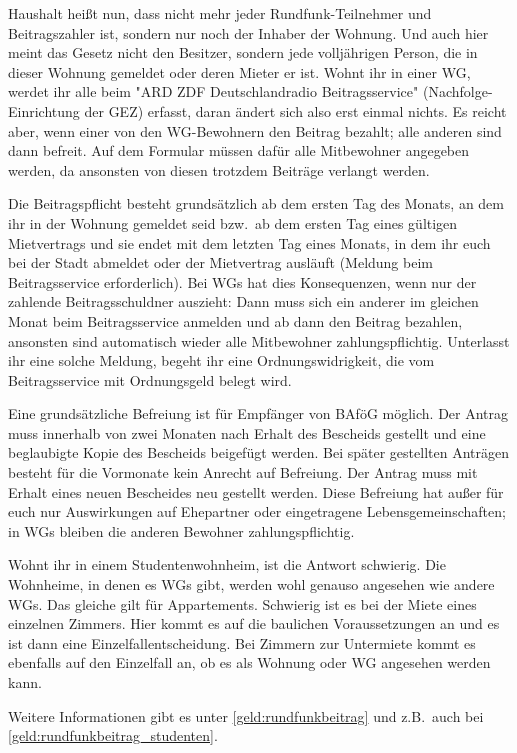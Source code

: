 \begin{multicols*}{2}
Haushalt heißt nun, dass nicht mehr jeder Rundfunk-Teilnehmer und Beitragszahler ist, sondern nur noch der Inhaber der Wohnung. Und auch hier meint das Gesetz nicht den Besitzer, sondern jede volljährigen Person, die in dieser Wohnung gemeldet oder deren Mieter er ist. Wohnt ihr in einer WG, werdet ihr alle beim "ARD ZDF Deutschlandradio Beitragsservice" (Nachfolge-Einrichtung der GEZ) erfasst, daran ändert sich also erst einmal nichts. Es reicht aber, wenn einer von den WG-Bewohnern den Beitrag bezahlt; alle anderen sind dann befreit. Auf dem Formular müssen dafür alle Mitbewohner angegeben werden, da ansonsten von diesen trotzdem Beiträge verlangt werden.

Die Beitragspflicht besteht grundsätzlich ab dem ersten Tag des Monats, an dem ihr in der Wohnung gemeldet seid bzw.\ ab dem ersten Tag eines gültigen Mietvertrags und sie endet mit dem letzten Tag eines Monats, in dem ihr euch bei der Stadt abmeldet oder der Mietvertrag ausläuft (Meldung beim Beitragsservice erforderlich). Bei WGs hat dies Konsequenzen, wenn nur der zahlende Beitragsschuldner auszieht: Dann muss sich ein anderer im gleichen Monat beim Beitragsservice anmelden und ab dann den Beitrag bezahlen, ansonsten sind automatisch wieder alle Mitbewohner zahlungspflichtig. Unterlasst ihr eine solche Meldung, begeht ihr eine Ordnungswidrigkeit, die vom Beitragsservice mit Ordnungsgeld belegt wird.

Eine grundsätzliche Befreiung ist für Empfänger von BAföG möglich. Der Antrag muss innerhalb von zwei Monaten nach Erhalt des Bescheids gestellt und eine beglaubigte Kopie des Bescheids beigefügt werden. Bei später gestellten Anträgen besteht für die Vormonate kein Anrecht auf Befreiung. Der Antrag muss mit Erhalt eines neuen Bescheides neu gestellt werden. Diese Befreiung hat außer für euch nur Auswirkungen auf Ehepartner oder eingetragene Lebensgemeinschaften; in WGs bleiben die anderen Bewohner zahlungspflichtig.

Wohnt ihr in einem Studentenwohnheim, ist die Antwort schwierig. Die Wohnheime, in denen es WGs gibt, werden wohl genauso angesehen wie andere WGs. Das gleiche gilt für Appartements. Schwierig ist es bei der Miete eines einzelnen Zimmers. Hier kommt es auf die baulichen Voraussetzungen an und es ist dann eine Einzelfallentscheidung. Bei Zimmern zur Untermiete kommt es ebenfalls auf den Einzelfall an, ob es als Wohnung oder WG angesehen werden kann.

Weitere Informationen gibt es unter \cref{geld:rundfunkbeitrag} und z.B.\ auch bei \cref{geld:rundfunkbeitrag_studenten}.


\end{multicols*}
